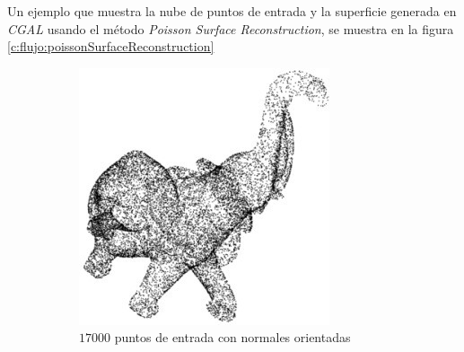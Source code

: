 
Un ejemplo que muestra la nube de puntos de entrada y la superficie generada en \emph{CGAL} usando el método \emph{Poisson Surface Reconstruction}, se muestra en la figura \ref{c:flujo:poissonSurfaceReconstruction}

\begin{figure}[h]

	\begin{subfigure}[b]{0.45\textwidth}
		\centering
			\includegraphics[width=\textwidth]{images/flujo/refinamiento_1_0.jpg}
			\caption{$17000$ puntos de entrada con normales orientadas}
			\label{f:flujoDeTrabajo:refinamiento_1_0}
	\end{subfigure}
	~
	\begin{subfigure}[b]{0.45\textwidth}

\end{subfigure}
\end{figure}
